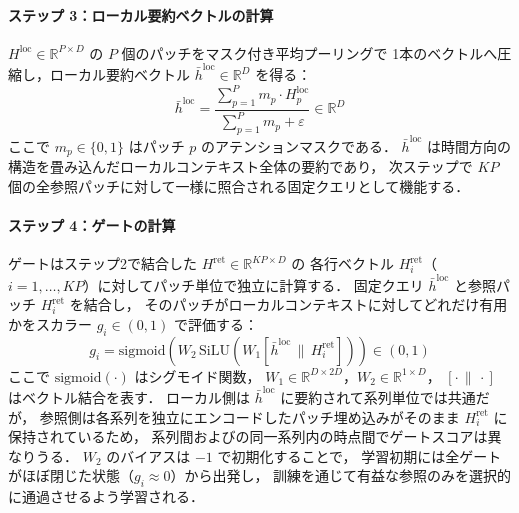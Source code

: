 \documentclass[twocolumn, lastpage]{jarticle}
\begin{document}
    \paragraph{ステップ 3：ローカル要約ベクトルの計算}
    $H^{\mathrm{loc}} \in \mathbb{R}^{P \times D}$ の $P$ 個のパッチをマスク付き平均プーリングで
    1本のベクトルへ圧縮し，ローカル要約ベクトル $\bar{h}^{\mathrm{loc}} \in \mathbb{R}^D$ を得る：
        \begin{equation}
            \bar{h}^{\mathrm{loc}} = \frac{\sum_{p=1}^{P} m_p \cdot H^{\mathrm{loc}}_p}
            {\sum_{p=1}^{P} m_p + \varepsilon} \in \mathbb{R}^{D}
        \end{equation}
    ここで $m_p \in \{0, 1\}$ はパッチ $p$ のアテンションマスクである．
    $\bar{h}^{\mathrm{loc}}$ は時間方向の構造を畳み込んだローカルコンテキスト全体の要約であり，
    次ステップで $KP$ 個の全参照パッチに対して一様に照合される固定クエリとして機能する．

    \paragraph{ステップ 4：ゲートの計算}
    ゲートはステップ2で結合した $H^{\mathrm{ret}} \in \mathbb{R}^{KP \times D}$ の
    各行ベクトル $H^{\mathrm{ret}}_i$（$i = 1, \ldots, KP$）に対してパッチ単位で独立に計算する．
    固定クエリ $\bar{h}^{\mathrm{loc}}$ と参照パッチ $H^{\mathrm{ret}}_i$ を結合し，
    そのパッチがローカルコンテキストに対してどれだけ有用かをスカラー $g_i \in (0,1)$ で評価する：
        \begin{equation}
            g_i = \mathrm{sigmoid}\!\left(
            W_2\, \mathrm{SiLU}\!\left(
            W_1 \left[\bar{h}^{\mathrm{loc}} \,\|\, H^{\mathrm{ret}}_i\right]
            \right)
            \right) \in (0, 1)
        \end{equation}
    ここで $\mathrm{sigmoid}(\cdot)$ はシグモイド関数，
    $W_1 \in \mathbb{R}^{D \times 2D}$，$W_2 \in \mathbb{R}^{1 \times D}$，
    $[\cdot \,\|\, \cdot]$ はベクトル結合を表す．
    ローカル側は $\bar{h}^{\mathrm{loc}}$ に要約されて系列単位では共通だが，
    参照側は各系列を独立にエンコードしたパッチ埋め込みがそのまま $H^{\mathrm{ret}}_i$ に保持されているため，
    系列間およびの同一系列内の時点間でゲートスコアは異なりうる．
    $W_2$ のバイアスは $-1$ で初期化することで，
    学習初期には全ゲートがほぼ閉じた状態（$g_i \approx 0$）から出発し，
    訓練を通じて有益な参照のみを選択的に通過させるよう学習される．
\end{document}

